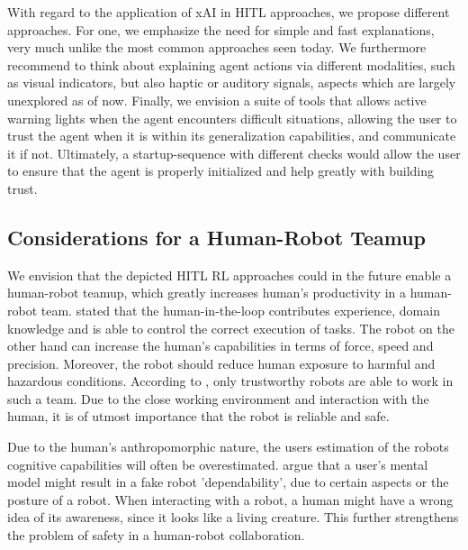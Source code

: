 \documentclass[twoside,11pt]{article}
\begin{document}

With regard to the application of xAI in HITL approaches, we propose different approaches. For one, we emphasize the need for simple and fast explanations, very much unlike the most common approaches seen today. We furthermore recommend to think about explaining agent actions via different modalities, such as visual indicators, but also haptic or auditory signals, aspects which are largely unexplored as of now. Finally, we envision a suite of tools that allows active warning lights when the agent encounters difficult situations, allowing the user to trust the agent when it is within its generalization capabilities, and communicate it if not. Ultimately, a startup-sequence with different checks would allow the user to ensure that the agent is properly initialized and help greatly with building trust.

\subsection{Considerations for a Human-Robot Teamup}

We envision that the depicted HITL RL approaches could in the future enable a human-robot teamup, which greatly increases human's productivity in a human-robot team. \cite{KhatibEtAl:1999:RihEnvironment} stated that the human-in-the-loop contributes experience, domain knowledge and is able to control the correct execution of tasks. The robot on the other hand can increase the human's capabilities in terms of force, speed and precision. Moreover, the robot should reduce human exposure to harmful and hazardous conditions. According to \cite{DeSaintsEtAl:2008:phri}, only trustworthy robots are able to work in such a team. Due to the close working environment and interaction with the human, it is of utmost importance that the robot is reliable and safe.

Due to the human's anthropomorphic nature, the users estimation of the robots cognitive capabilities will often be overestimated. \cite{DeSaintsEtAl:2008:phri} argue that a user's mental model might result in a fake robot 'dependability', due to certain aspects or the posture of a robot. When interacting with a robot, a human might have a wrong idea of its awareness, since it looks like a living creature. This further strengthens the problem of safety in a human-robot collaboration.
\end{document}
